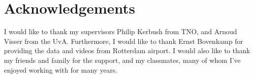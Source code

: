 \documentclass[11pt]{book}
\begin{document}




\graphicspath{{.}{../results}}

\listoftodos
\newpage
\section{Acknowledgements}
I would like to thank my supervisors Philip Kerbush from TNO, and Arnoud Visser from the UvA. Furthermore, I would like to thank Ernst Bovenkamp for providing the data and videos from Rotterdam airport. I would also like to thank my friends and family for the support, and my classmates, many of whom I've enjoyed working with for many years.
\newpage
\tableofcontents
\newpage
\end{document}
